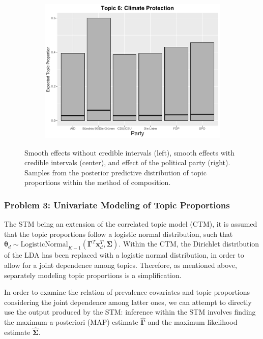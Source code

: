 \begin{figure}[h!]
\begin{subfigure}[b]{0.3\linewidth}
    \includegraphics[width=\linewidth]{../plots/5_1/stanbeta_t6_cat.pdf}
  \end{subfigure}
  \caption{Smooth effects without credible intervals (left), smooth effects with credible intervals (center), and effect of the political party (right). Samples from the posterior predictive distribution of topic proportions within the method of composition.}
  \label{fig:stanbeta}
\end{figure}

\subsubsection{Problem 3: Univariate Modeling of Topic Proportions}
\label{Direct assessment}

The STM being an extension of the correlated topic model (CTM), it is assumed that the topic proportions follow a logistic normal distribution, such that $\boldsymbol{\theta}_d \sim \text{LogisticNormal}_{K-1}(\boldsymbol{\Gamma}^T\boldsymbol{x}_d^T, \boldsymbol{\Sigma})$. Within the CTM, the Dirichlet distribution of the LDA has been replaced with a logistic normal distribution, in order to allow for a joint dependence among topics. Therefore, as mentioned above, separately modeling topic proportions is a simplification. 

In order to examine the relation of prevalence covariates and topic proportions considering the joint dependence among latter ones, we can attempt to directly use the output produced by the STM: inference within the STM involves finding the maximum-a-posteriori (MAP) estimate $\hat{\boldsymbol{\Gamma}}$ and the maximum likelihood estimate $\hat{\boldsymbol{\Sigma}}$. 

